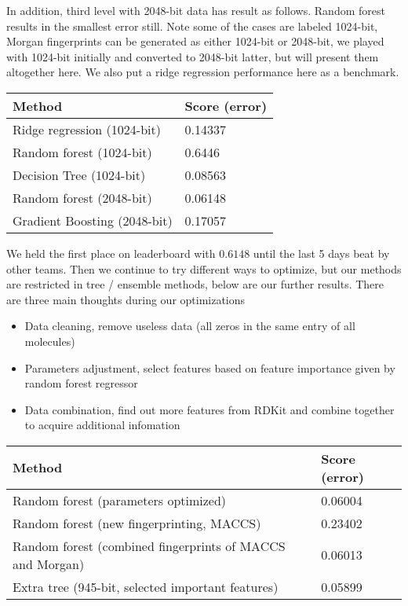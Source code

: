 In addition, third level with 2048-bit data has result as follows. Random forest results in the smallest error still. Note some of the cases are labeled 1024-bit, Morgan fingerprints can be generated as either 1024-bit or 2048-bit, we played with 1024-bit initially and converted to 2048-bit latter, but will present them altogether here. We also put a ridge regression performance here as a benchmark.

\begin{center}
    \begin{tabular}{| l | l ||}
    \hline
    \textbf{Method} & \textbf{Score (error)} \\ \hline
    Ridge regression (1024-bit) & 0.14337 \\ \hline
    Random forest (1024-bit) & 0.6446 \\ \hline
    Decision Tree (1024-bit) & 0.08563 \\ \hline
    Random forest (2048-bit) & 0.06148 \\ \hline
    Gradient Boosting (2048-bit) & 0.17057 \\ \hline
    \hline
    \end{tabular}
\end{center}

We held the first place on leaderboard with $0.6148$ until the last 5 days beat by other teams. Then we continue to try different ways to optimize, but our methods are restricted in tree / ensemble methods, below are our further results. There are three main thoughts during our optimizations

\begin{itemize}
    \item Data cleaning, remove useless data (all zeros in the same entry of all molecules)
    \item Parameters adjustment, select features based on feature importance given by random forest regressor
    \item Data combination, find out more features from RDKit and combine together to acquire additional infomation
\end{itemize}

\begin{center}
    \begin{tabular}{|l|l||}
    \hline
    \textbf{Method} & \textbf{Score (error)} \\ \hline
    Random forest (parameters optimized) & 0.06004 \\ \hline
    Random forest (new fingerprinting, MACCS) & 0.23402 \\ \hline
    Random forest (combined fingerprints of MACCS and Morgan) & 0.06013 \\ \hline
    Extra tree (945-bit, selected important features) & 0.05899  \\ \hline
    \hline
    \end{tabular}
\end{center}